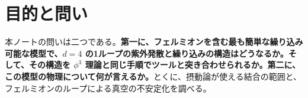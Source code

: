 \documentclass[a4paper,10pt]{ltjsarticle}
\begin{document}
\begin{abstract}
の質量と極質量の二つの処方の四つのツールで手計算と相対 $4\times10^{-12}$ 以内で一致し、Machacek と Vaughn の一般の公式も六つの係数をすべて再現した。$\phi\phi$ と $\psi\bar\psi$ のヘリシティの部分波を合わせた木のユニタリー性は、結合を固定すると $y<\sqrt{8\pi/3}$、$|\lambda|<16\pi$ を与え（一般の湯川理論の文献の値と一致）、結合の走りを入れて $10m$ まで使うことを求めると $y(m)\le1.94$ になる。繰り込み群で改良した有効ポテンシャルは基準点で $\phi\approx39m$ から負になり、$\lambda<0$ の bounce の作用 $16\pi^2/|\lambda(1/R)|$ は小さな $R$ に向かって単調に減って極小を持たないので、真空の崩壊は理論の切断のスケールで決まる。Andreassen らの閉じた形のフェルミオンと $\phi$ の行列式を Gel'fand--Yaglom の方法と運動量積分で独立に確かめて1ループの前因子を求めると、フェルミオンの行列式は崩壊を速めるが、$\lambda$ の零点の近くでは補正が木と同じ程度になる。そこで $\lambda$ を $y^4/(4\pi)^2$ と同じ次数と数え直し、フェルミオンの行列式の大きな部分が局所的な有効ポテンシャルであること（微分展開、部分波の和と $|w|=1000$ まで一致）を使って bounce の作用に足し上げた。大きさを固定した bounce を球面 $S^4$ の上で解くと、作用は $16\pi^2f(\varepsilon)/|\lambda(\mu_R)|$（$f=1+\frac{13}{90}\varepsilon^2+\cdots$）で、大きさ $R$ の bounce は $1/R$ ではなく $\mu_R\approx1.4y/(\sqrt{|\lambda|}R)$ の結合を見る。崩壊率は $\lambda$ の零点の近くでも数\%の幅で決まり、ヒッグスに読み替えた宇宙論的な条件は、基準点で bounce の大きさの切断を $\Lambda_{\max}=16.0m$（$\lambda$ の零点の $0.82$ 倍、木の評価の $2.6$ 分の1）に制限する。$\psi\bar\psi\to\psi\bar\psi$ の1ループの振幅は、頂点の補正が一つの擬スカラーの形状因子に、箱が二つの $\phi$ と二つの $\psi$ の階数2のテンソル積分にまとまり、FeynCalc の射影、MadLoop、部分波のユニタリー性と一致した。これで $J=0$ の部分波の行列が1ループで完成し、1ループのユニタリー性は $\mu=m$、$\sqrt s\le4m$ で $y\le2.86$（$\mu=m/2$〜$2m$ で $2.77$〜$3.04$）を与える。導出はすべて付録に省略なく載せる。
\end{abstract}

\tableofcontents

\section{目的と問い}\label{sec:intro}

本ノートの問いは二つである。\textbf{第一に、フェルミオンを含む最も簡単な繰り込み可能な模型で、$d=4$ の1ループの紫外発散と繰り込みの構造はどうなるか。そして、その構造を $\phi^3$ 理論と同じ手順でツールと突き合わせられるか。第二に、この模型の物理について何が言えるか。}とくに、摂動論が使える結合の範囲と、フェルミオンのループによる真空の不安定化を調べる。
\end{document}
